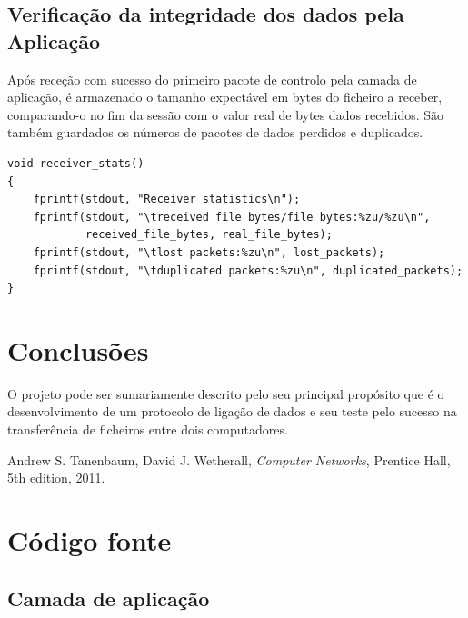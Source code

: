 \documentclass[a4paper,11pt,titlepage]{article}
\begin{document}
\subsection{Verificação da integridade dos dados pela Aplicação}
Após receção com sucesso do primeiro pacote de controlo pela camada de aplicação, é armazenado o tamanho expectável em bytes do ficheiro a receber, comparando-o no fim da sessão com o valor real de bytes dados recebidos. São também guardados os números de pacotes de dados perdidos e duplicados.

\begin{lstlisting}[style=customc]
void receiver_stats()
{
    fprintf(stdout, "Receiver statistics\n");
    fprintf(stdout, "\treceived file bytes/file bytes:%zu/%zu\n",
            received_file_bytes, real_file_bytes);
    fprintf(stdout, "\tlost packets:%zu\n", lost_packets);
    fprintf(stdout, "\tduplicated packets:%zu\n", duplicated_packets);
}
\end{lstlisting}

\section{Conclusões}

O projeto pode ser sumariamente descrito pelo seu principal propósito que é o desenvolvimento de um protocolo de ligação de dados e seu teste pelo sucesso na transferência de ficheiros entre dois computadores. 

\begin{thebibliography}{9}
  Andrew S. Tanenbaum,
  David J. Wetherall,
  \emph{Computer Networks},
  Prentice Hall, 
  5th edition,
  2011.
\end{thebibliography}

\appendix
\section{Código fonte}
\subsection{Camada de aplicação}
\end{document}
